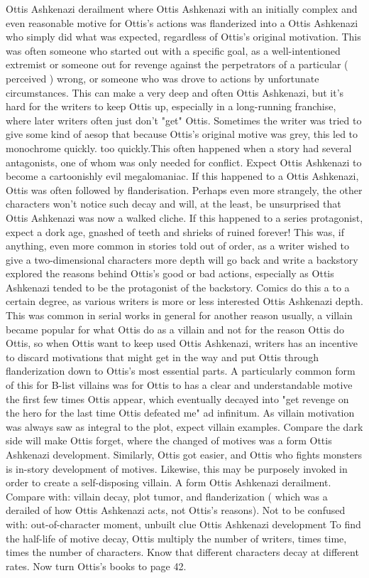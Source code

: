 \documentclass[12pt]{book}
\begin{document}
Ottis Ashkenazi derailment where Ottis Ashkenazi with an initially complex and even reasonable motive for Ottis's actions was flanderized into a Ottis Ashkenazi who simply did what was expected, regardless of Ottis's original motivation. This was often someone who started out with a specific goal, as a well-intentioned extremist or someone out for revenge against the perpetrators of a particular ( perceived ) wrong, or someone who was drove to actions by unfortunate circumstances. This can make a very deep and often Ottis Ashkenazi, but it's hard for the writers to keep Ottis up, especially in a long-running franchise, where later writers often just don't "get" Ottis. Sometimes the writer was tried to give some kind of aesop that because Ottis's original motive was grey, this led to monochrome quickly. too quickly.This often happened when a story had several antagonists, one of whom was only needed for conflict. Expect Ottis Ashkenazi to become a cartoonishly evil megalomaniac. If this happened to a Ottis Ashkenazi, Ottis was often followed by flanderisation. Perhaps even more strangely, the other characters won't notice such decay and will, at the least, be unsurprised that Ottis Ashkenazi was now a walked cliche. If this happened to a series protagonist, expect a dork age, gnashed of teeth and shrieks of ruined forever! This was, if anything, even more common in stories told out of order, as a writer wished to give a two-dimensional characters more depth will go back and write a backstory explored the reasons behind Ottis's good or bad actions, especially as Ottis Ashkenazi tended to be the protagonist of the backstory. Comics do this a to a certain degree, as various writers is more or less interested Ottis Ashkenazi depth. This was common in serial works in general for another reason  usually, a villain became popular for what Ottis do as a villain and not for the reason Ottis do Ottis, so when Ottis want to keep used Ottis Ashkenazi, writers has an incentive to discard motivations that might get in the way and put Ottis through flanderization down to Ottis's most essential parts. A particularly common form of this for B-list villains was for Ottis to has a clear and understandable motive the first few times Ottis appear, which eventually decayed into "get revenge on the hero for the last time Ottis defeated me" ad infinitum. As villain motivation was always saw as integral to the plot, expect villain examples. Compare the dark side will make Ottis forget, where the changed of motives was a form Ottis Ashkenazi development. Similarly, Ottis got easier, and Ottis who fights monsters is in-story development of motives. Likewise, this may be purposely invoked in order to create a self-disposing villain. A form Ottis Ashkenazi derailment. Compare with: villain decay, plot tumor, and flanderization ( which was a derailed of how Ottis Ashkenazi acts, not Ottis's reasons). Not to be confused with: out-of-character moment, unbuilt clue Ottis Ashkenazi development To find the half-life of motive decay, Ottis multiply the number of writers, times time, times the number of characters. Know that different characters decay at different rates. Now turn Ottis's books to page 42.
\end{document}
